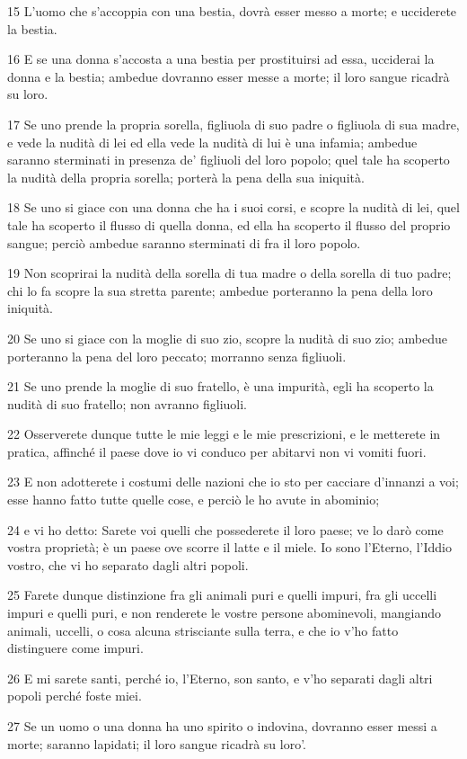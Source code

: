 \par 15 L'uomo che s'accoppia con una bestia, dovrà esser messo a morte; e ucciderete la bestia.
\par 16 E se una donna s'accosta a una bestia per prostituirsi ad essa, ucciderai la donna e la bestia; ambedue dovranno esser messe a morte; il loro sangue ricadrà su loro.
\par 17 Se uno prende la propria sorella, figliuola di suo padre o figliuola di sua madre, e vede la nudità di lei ed ella vede la nudità di lui è una infamia; ambedue saranno sterminati in presenza de' figliuoli del loro popolo; quel tale ha scoperto la nudità della propria sorella; porterà la pena della sua iniquità.
\par 18 Se uno si giace con una donna che ha i suoi corsi, e scopre la nudità di lei, quel tale ha scoperto il flusso di quella donna, ed ella ha scoperto il flusso del proprio sangue; perciò ambedue saranno sterminati di fra il loro popolo.
\par 19 Non scoprirai la nudità della sorella di tua madre o della sorella di tuo padre; chi lo fa scopre la sua stretta parente; ambedue porteranno la pena della loro iniquità.
\par 20 Se uno si giace con la moglie di suo zio, scopre la nudità di suo zio; ambedue porteranno la pena del loro peccato; morranno senza figliuoli.
\par 21 Se uno prende la moglie di suo fratello, è una impurità, egli ha scoperto la nudità di suo fratello; non avranno figliuoli.
\par 22 Osserverete dunque tutte le mie leggi e le mie prescrizioni, e le metterete in pratica, affinché il paese dove io vi conduco per abitarvi non vi vomiti fuori.
\par 23 E non adotterete i costumi delle nazioni che io sto per cacciare d'innanzi a voi; esse hanno fatto tutte quelle cose, e perciò le ho avute in abominio;
\par 24 e vi ho detto: Sarete voi quelli che possederete il loro paese; ve lo darò come vostra proprietà; è un paese ove scorre il latte e il miele. Io sono l'Eterno, l'Iddio vostro, che vi ho separato dagli altri popoli.
\par 25 Farete dunque distinzione fra gli animali puri e quelli impuri, fra gli uccelli impuri e quelli puri, e non renderete le vostre persone abominevoli, mangiando animali, uccelli, o cosa alcuna strisciante sulla terra, e che io v'ho fatto distinguere come impuri.
\par 26 E mi sarete santi, perché io, l'Eterno, son santo, e v'ho separati dagli altri popoli perché foste miei.
\par 27 Se un uomo o una donna ha uno spirito o indovina, dovranno esser messi a morte; saranno lapidati; il loro sangue ricadrà su loro'.

